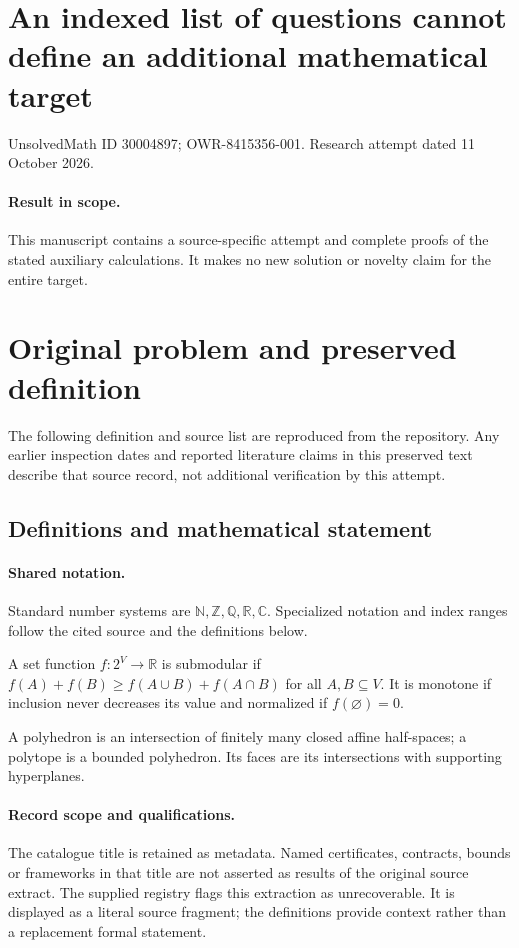 \documentclass[11pt]{article}
\begin{document}
\section*{An indexed list of questions cannot define an additional mathematical target}
\noindent UnsolvedMath ID 30004897; OWR-8415356-001. Research attempt dated 11 October 2026.
\paragraph{Result in scope.}This manuscript contains a source-specific attempt and complete proofs of the stated auxiliary calculations. It makes no new solution or novelty claim for the entire target.
\section{Original problem and preserved definition}
The following definition and source list are reproduced from the repository. Any earlier inspection dates and reported literature claims in this preserved text describe that source record, not additional verification by this attempt.
\subsection{Definitions and mathematical statement}

\paragraph{Shared notation.}Standard number systems are $\mathbb N,\mathbb Z,\mathbb Q,\mathbb R,\mathbb C$. Specialized notation and index ranges follow the cited source and the definitions below.


A set function $f:2^V\to\mathbb R$ is submodular if $f(A)+f(B)\geq f(A\cup B)+f(A\cap B)$ for all $A,B\subseteq V$. It is monotone if inclusion never decreases its value and normalized if $f(\varnothing)=0$.

A polyhedron is an intersection of finitely many closed affine half-spaces; a polytope is a bounded polyhedron. Its faces are its intersections with supporting hyperplanes.
\paragraph{Record scope and qualifications.}
The catalogue title is retained as metadata. Named certificates, contracts, bounds or frameworks in that title are not asserted as results of the original source extract.
The supplied registry flags this extraction as unrecoverable. It is displayed as a literal source fragment; the definitions provide context rather than a replacement formal statement.
\end{document}
